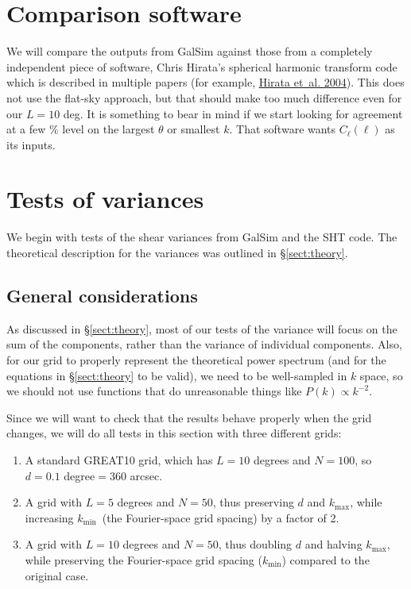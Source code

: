\documentclass[preprint]{aastex}
\newcommand{\kmax}{\ensuremath{k_\mathrm{max}}}
\newcommand{\kmin}{\ensuremath{k_\mathrm{min}}}
\begin{document}
\section{Comparison software}\label{S:comparison}

We will compare the outputs from GalSim against those from a completely independent piece of software,
Chris Hirata's spherical harmonic transform code which is described in
multiple papers (for example,
\href{http://adsabs.harvard.edu/abs/2004PhRvD..70j3501H}{Hirata
  et~al. 2004}).  This does not use the flat-sky
approach, but that should make too much difference even
for our $L=10$ deg.  It is something to bear in mind if we start
looking for agreement at a few \% level on the largest $\theta$ or
smallest $k$.  That software wants $C_\ell(\ell)$ as its inputs.

\section{Tests of variances}\label{S:testvar}

We begin with tests of the shear variances from GalSim and the SHT
code.  The theoretical 
description for the variances was outlined in \S\ref{sect:theory}.

\subsection{General considerations}

As discussed in \S\ref{sect:theory}, most of our tests of the variance
will focus on the sum of the components, rather than the variance of
individual components.  Also, for our grid to properly represent the
theoretical power spectrum (and for the equations in
\S\ref{sect:theory} to be valid), we need to be well-sampled in $k$
space, so we should not use functions that do unreasonable things like
$P(k)\propto k^{-2}$.

Since we will want to check that the results behave properly when the
grid changes, we will do all tests in this section with three
different grids:
\begin{enumerate}
\item A standard GREAT10 grid, which has $L=10$ degrees and $N=100$,
  so $d=0.1$ degree$=360$ arcsec.
\item A grid with $L=5$ degrees and $N=50$, thus preserving $d$ and
  \kmax, while increasing \kmin\ (the Fourier-space grid spacing) by a
  factor of 2.
\item A grid with $L=10$ degrees and $N=50$, thus doubling $d$ and
  halving \kmax, while preserving the Fourier-space grid spacing
  (\kmin) compared to the original case.
\end{enumerate}
\end{document}
